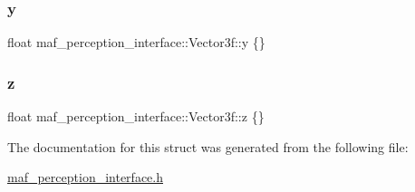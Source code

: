 \subsubsection{\texorpdfstring{y}{y}}
{\footnotesize\ttfamily float maf\+\_\+perception\+\_\+interface\+::\+Vector3f\+::y \{\}}

\mbox{\label{structmaf__perception__interface_1_1Vector3f_ac078bbbbe561f8ff8bbe27a7a43f59a2}} 
\subsubsection{\texorpdfstring{z}{z}}
{\footnotesize\ttfamily float maf\+\_\+perception\+\_\+interface\+::\+Vector3f\+::z \{\}}



The documentation for this struct was generated from the following file\+:\begin{DoxyCompactItemize}
\item 
\hyperlink{maf__perception__interface_8h}{maf\+\_\+perception\+\_\+interface.\+h}\end{DoxyCompactItemize}
